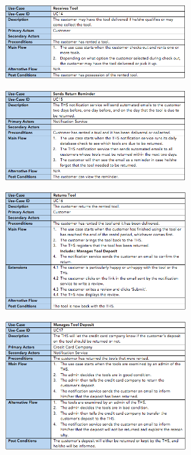 \documentclass[fontsize=11pt]{extarticle}
\numberwithin{figure}{section} %
\numberwithin{table}{section}%
\begin{document}
\begin{figure}[H]
      \centering
      \includegraphics[trim = 0 0 0 0, clip, width=0.7\textwidth]{TempImg/UC14.png}
 \end{figure}

\begin{figure}[H]
      \centering
      \includegraphics[trim = 0 0 0 0, clip, width=0.7\textwidth]{TempImg/UC15.png}
 \end{figure}

\begin{figure}[H]
      \centering
      \includegraphics[trim = 0 0 0 0, clip, width=0.7\textwidth]{TempImg/UC16.png}
 \end{figure}

\begin{figure}[H]
      \centering
      \includegraphics[trim = 0 0 0 0, clip, width=0.7\textwidth]{TempImg/UC17.png}
 \end{figure}
\end{document}
